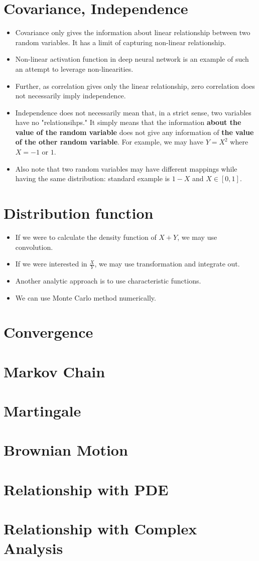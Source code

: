 \documentclass[11pt,reqno]{amsart}
\theoremstyle{remark}
\begin{document}
\section*{Covariance, Independence}
\begin{itemize}
\item Covariance only gives the information about linear relationship between two random variables. It has a limit of capturing non-linear relationship.
\item Non-linear activation function in deep neural network is an example of such an attempt to leverage non-linearities.
\item Further, as correlation gives only the linear relationship, zero correlation does not necessarily imply independence.
\item Independence does not necessarily mean that, in a strict sense, two variables have no "relationsihps." It simply means
 that the information \textbf{about the value of the random variable} does not give any information of \textbf{the value of the other random variable}. For example, we may have $Y=X^2$ where $X=-1$ or $1$.
\item Also note that two random variables may have different mappings while having the same distribution: standard example is $1-X$ and $X\in [0,1]$.
\end{itemize}

\section*{Distribution function}
\begin{itemize}
\item If we were to calculate the density function of $X+Y$, we may use convolution.
\item If we were interested in $\frac XY$, we may use transformation and integrate out. 
\item Another analytic approach is to use characteristic functions.
\item We can use Monte Carlo method numerically.

\end{itemize}

\section*{Convergence}

\section*{Markov Chain}

\section*{Martingale}

\section*{Brownian Motion}

\section*{Relationship with PDE}

\section*{Relationship with Complex Analysis}
\end{document}
